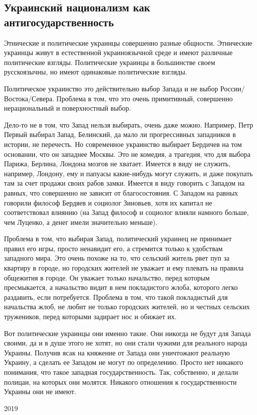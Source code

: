  
 
 

\subsection{Украинский национализм как антигосударственность}

Этнические и политические украинцы совершенно разные общности. Этнические
украинцы живут в естественной украиноязычной среде и имеют различные
политические взгляды. Политические украинцы в большинстве своем русскоязычны,
но имеют одинаковые политические взгляды.

Политическое украинство это действительно выбор Запада и не выбор
России/Востока/Севера. Проблема в том, что это очень примитивный, совершенно
нерациональный и поверхностный выбор.

Дело-то не в том, что Запад нельзя выбирать, очень даже можно. Например, Петр
Первый выбирал Запад, Белинский, да мало ли прогрессивных западников в истории,
не перечесть. Но современное украинство выбирает Бердичев на том основании, что
он западнее Москвы. Это не комедия, а трагедия, что для выбора Парижа, Берлина,
Лондона мозгов не хватает. Имеется в виду не служить, например, Лондону, ему и
папуасы какие-нибудь могут служить, и даже покупать там за счет продажи своих
рабов замки. Имеется в виду говорить с Западом на равных, что совершенно не
зависит от благосостояния. С Западом на равных говорили философ Бердяев и
социолог Зиновьев, хотя их капитал не соответствовал влиянию (на Запад философ
и социолог влияли намного больше, чем Луценко, а денег имели значительно
меньше).

Проблема в том, что выбирая Запад, политический украинец не принимает правил
его игры, просто ненавидит его, а стремится только к удобствам западного мира.
Это очень похоже на то, что сельский житель рвет пуп за квартиру в городе, но
городских жителей не уважает и ему плевать на правила общежития в городе. Он
уважает только начальство, перед которым пресмыкается, а начальство видит в нем
покладистого жлоба, которого легко раздавить, если потребуется. Проблема в том,
что такой покладистый для начальства жлоб, не любит не только городских
жителей, но и честных сельских тружеников, перед которыми задирает нос и
обижает их.

Вот политические украинцы они именно такие. Они никогда не будут для Запада
своими, да и в душе этого не хотят, но они стали чужими для реального народа
Украины. Получив ясак на княжение от Запада они уничтожают реальную Украину, а
сделать ее Западом не могут по определению. Просто нет никакого понимания, что
такое западная государственность. Так, собственно, и делали полицаи, на которых
они молятся. Никакого отношения к государственности Украины они не имеют.

2019
